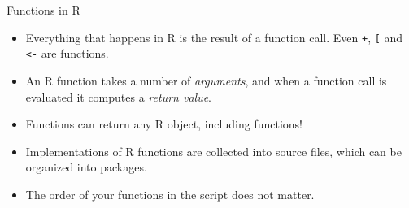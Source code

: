 \documentclass[
  ignorenonframetext,
  aspectratio=1610,
  onlytextwidth]{beamer}
\providecommand{\tightlist}{}
\begin{document}
\begin{frame}[fragile]{Functions in R}
\label{functions-in-r}
\begin{itemize}[<+->]
\tightlist
\item
  Everything that happens in R is the result of a function call. Even
  \texttt{+}, \texttt{{[}} and \texttt{\textless{}-} are functions.
\item
  An R function takes a number of \emph{arguments}, and when a function
  call is evaluated it computes a \emph{return value}.
\item
  Functions can return any R object, including functions!
\item
  Implementations of R functions are collected into source files, which
  can be organized into packages.
\item
  The order of your functions in the script does not matter.
\end{itemize}
\end{frame}
\end{document}
